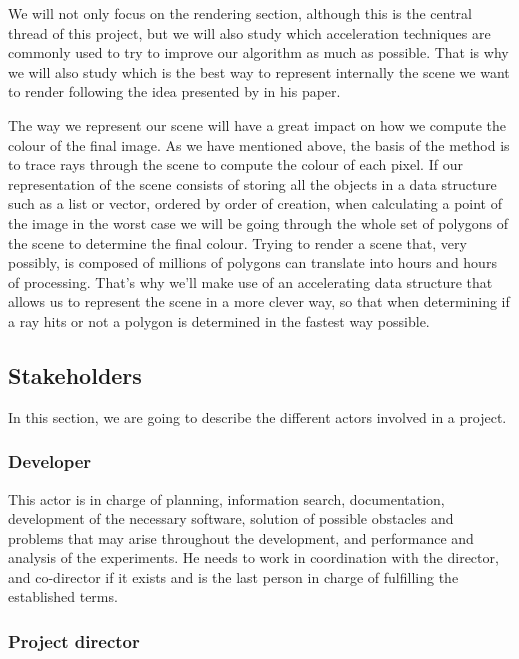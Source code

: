 \documentclass[titlepage,12pt]{report}
\begin{document}
We will not only focus on the rendering section, although this is the central thread of this project, but we will also study which acceleration techniques are commonly used to try to improve our algorithm as much as possible. That is why we will also study which is the best way to represent internally the scene we want to render following the idea presented by \citep{Karras2012} in his paper.

The way we represent our scene will have a great impact on how we compute the colour of the final image. As we have mentioned above, the basis of the method is to trace rays through the scene to compute the colour of each pixel. If our representation of the scene consists of storing all the objects in a data structure such as a list or vector, ordered by order of creation, when calculating a point of the image in the worst case we will be going through the whole set of polygons of the scene to determine the final colour. Trying to render a scene that, very possibly, is composed of millions of polygons can translate into hours and hours of processing. That's why we'll make use of an accelerating data structure that allows us to represent the scene in a more clever way, so that when determining if a ray hits or not a polygon is determined in the fastest way possible.

\subsection{Stakeholders}

In this section, we are going to describe the different actors involved in a project.

\subsubsection{Developer}

This actor is in charge of planning, information search, documentation, development of the necessary software, solution of possible obstacles and problems that may arise throughout the development, and performance and analysis of the experiments. He needs to work in coordination with the director, and co-director if it exists and is the last person in charge of fulfilling the established terms.

\subsubsection{Project director}
\end{document}
